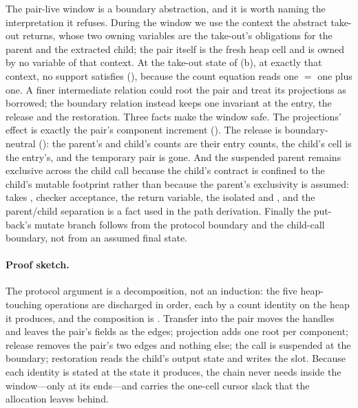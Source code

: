 \documentclass[a4paper,UKenglish,cleveref]{lipics-v2021}
\begin{document}
The pair-live window is a boundary abstraction, and it is worth naming the
interpretation it refuses. During the window we use the context the abstract
take-out returns, whose two owning variables are the take-out's obligations for
the parent and the extracted child; the pair itself is the fresh heap cell and is
owned by no variable of that context. At the take-out state of
(b), at exactly that context, no support satisfies
 (), because the count equation reads one
$=$ one plus one. A finer intermediate relation could root the pair and treat its
projections as borrowed; the boundary relation instead keeps one invariant at the
entry, the release and the restoration. Three facts make the window safe. The projections' effect
is exactly the pair's component increment (). The
release is boundary-neutral (): the parent's and
child's counts are their entry counts, the child's cell is the entry's, and the
temporary pair is gone. And the suspended parent remains exclusive across the
child call because the child's contract is confined to the child's mutable
footprint rather than because the parent's exclusivity is assumed:
 takes , checker acceptance, the
return variable, the isolated  and , and the
parent/child separation is a  fact used in the path
derivation. Finally the put-back's mutate branch follows from the protocol
boundary and the child-call boundary, not from an assumed final state.

\paragraph*{Proof sketch.}
The protocol argument is a decomposition, not an induction: the five heap-touching
operations are discharged in order, each by a count identity on the heap it
produces, and the composition is . Transfer into the
pair moves the handles and leaves the pair's fields as the edges; projection adds
one root per component; release removes the pair's two edges and nothing else;
the call is suspended at the boundary; restoration reads the child's output state
and writes the slot. Because each identity is stated at the state it produces,
the chain never needs  inside the window---only at its ends---and
 carries the one-cell cursor slack that the allocation leaves
behind.
\end{document}
